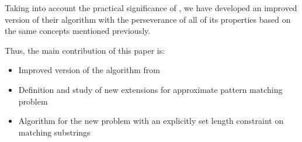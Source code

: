 Taking into account the practical significance of \cite{luciv2019interactive}, we have developed an improved version of their algorithm with the perseverance of all of its properties based on the same concepts mentioned previously.

Thus, the main contribution of this paper is:
\begin{itemize}
    \item Improved version of the algorithm from \cite{luciv2019interactive}
    \item Definition and study of new extensions for  approximate pattern matching problem
    \item Algorithm for the new problem with an explicitly set length constraint on matching substrings 
\end{itemize}









